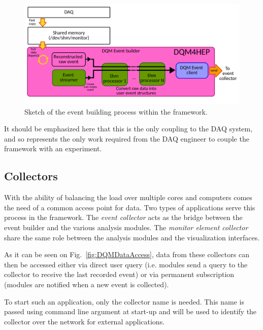 \documentclass[conference]{IEEEtran}
\begin{document}
\begin{figure}[htbp]
  \begin{center}
    \includegraphics[width=0.95\linewidth]{figs/EventBuilderDiagram_IEEE.pdf}
    \caption{\label{fig:DQMEventBuilder} Sketch of the event building process within the framework.}
  \end{center}
\end{figure}

It should be emphasized here that this is the only coupling to the DAQ system, and so represents the only work required from the DAQ engineer to couple the framework with an experiment.


\subsection{Collectors}
With the ability of balancing the load over multiple cores and computers comes the need of a common access point for data. Two types of applications serve this process in the framework. The \textit{event collector} acts as the bridge between the event builder and the various analysis modules. The \textit{monitor element collector} share the same role between the analysis modules and the visualization interfaces.

As it can be seen on Fig.~\ref{fig:DQMDataAccess}, data from these collectors can then be accessed either via direct user query (i.e. modules send a query to the collector to receive the last recorded event) or via permanent subscription (modules are notified when a new event is collected).

To start such an application, only the collector name is needed. This name is passed using command line argument at start-up and will be used to identify the collector over the network for external applications.  
\end{document}
